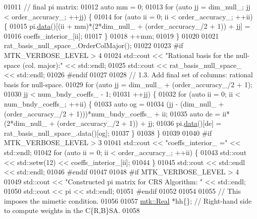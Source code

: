 \begin{DoxyCode}
{{01011   \textcolor{comment}{// final pi matrix:}
01012   \textcolor{keyword}{auto} mm = 0;
01013   \textcolor{keywordflow}{for} (\textcolor{keyword}{auto} jj = dim\_null\_; jj < order\_accuracy\_; ++jj) \{
01014     \textcolor{keywordflow}{for} (\textcolor{keyword}{auto} ii = 0; ii < order\_accuracy\_; ++ii) \{
01015       pi.\hyperlink{classmtk_1_1DenseMatrix_a0c33b8a9e01d157c61ddbdf807c25d84}{data}()[(ii + mm)*(2*dim\_null\_ + (order\_accuracy\_/2 + 1)) + jj] =
01016         coeffs\_interior\_[ii];
01017     \}
01018     ++mm;
01019   \}
01020 
01021   rat\_basis\_null\_space\_.OrderColMajor();
01022 
01023 \textcolor{preprocessor}{  #if MTK\_VERBOSE\_LEVEL > 4}
01024   std::cout << \textcolor{stringliteral}{"Rational basis for the null-space (col. major):"} << std::endl;
01025   std::cout << rat\_basis\_null\_space\_ << std::endl;
01026 \textcolor{preprocessor}{  #endif}
01027 
01028   \textcolor{comment}{// 1.3. Add final set of columns: rational basis for null-space.}
01029   \textcolor{keywordflow}{for} (\textcolor{keyword}{auto} jj = dim\_null\_ + (order\_accuracy\_/2 + 1);
01030        jj < num\_bndy\_coeffs\_ - 1;
01031        ++jj) \{
01032     \textcolor{keywordflow}{for} (\textcolor{keyword}{auto} ii = 0; ii < num\_bndy\_coeffs\_; ++ii) \{
01033       \textcolor{keyword}{auto} og =
01034         (jj - (dim\_null\_ + (order\_accuracy\_/2 + 1)))*num\_bndy\_coeffs\_ + ii;
01035       \textcolor{keyword}{auto} de = ii*(2*dim\_null\_ + (order\_accuracy\_/2 + 1)) + jj;
01036       pi.\hyperlink{classmtk_1_1DenseMatrix_a0c33b8a9e01d157c61ddbdf807c25d84}{data}()[de] = rat\_basis\_null\_space\_.data()[og];
01037     \}
01038   \}
01039 
01040 \textcolor{preprocessor}{  #if MTK\_VERBOSE\_LEVEL > 3}
01041   std::cout << \textcolor{stringliteral}{"coeffs\_interior\_ ="} << std::endl;
01042   \textcolor{keywordflow}{for} (\textcolor{keyword}{auto} ii = 0; ii < order\_accuracy\_; ++ii) \{
01043     std::cout << std::setw(12) << coeffs\_interior\_[ii];
01044   \}
01045   std::cout << std::endl << std::endl;
01046 \textcolor{preprocessor}{  #endif}
01047 
01048 \textcolor{preprocessor}{  #if MTK\_VERBOSE\_LEVEL > 4}
01049   std::cout << \textcolor{stringliteral}{"Constructed pi matrix for CRS Algorithm: "} << std::endl;
01050   std::cout << pi << std::endl;
01051 \textcolor{preprocessor}{  #endif}
01052 
01054 
01055   \textcolor{comment}{// This imposes the mimetic condition.}
01056 
01057   \hyperlink{group__c01-roots_gac080bbbf5cbb5502c9f00405f894857d}{mtk::Real} *hh\{\};  \textcolor{comment}{// Right-hand side to compute weights in the C\{R,B\}SA.}
01058 
}}
\end{DoxyCode}

